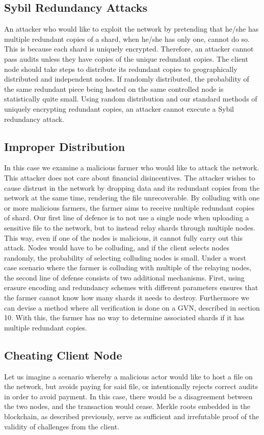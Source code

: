 \documentclass[a4paper,10pt]{article}
\begin{document}
\subsection{Sybil Redundancy Attacks}
An attacker who would like to exploit the network by pretending that he/she has multiple redundant copies of a shard, when he/she has only one, cannot do so. This is because each shard is uniquely encrypted. Therefore, an attacker cannot pass audits unless they have copies of the unique redundant copies. The client node should take steps to distribute its redundant copies to geographically distributed and independent nodes. If randomly distributed, the probability of the same redundant piece being hosted on the same controlled node is statistically quite small. Using random distribution and our standard methods of uniquely encrypting redundant copies, an attacker cannot execute a Sybil redundancy attack.  

\subsection{Improper Distribution}
In this case we examine a malicious farmer who would like to attack the network. This attacker does not care about financial disincentives. The attacker wishes to cause distrust in the network by dropping data and its redundant copies from the network at the same time, rendering the file unrecoverable. By colluding with one or more malicious farmers, the farmer aims to receive multiple redundant copies of shard. Our first line of defence is to not use a single node when uploading a sensitive file to the network, but to instead relay shards through multiple nodes. This way, even if one of the nodes is malicious, it cannot fully carry out this attack. Nodes would have to be colluding, and if the client selects nodes randomly, the probability of selecting colluding nodes is small. Under a worst case scenario where the farmer is colluding with multiple of the relaying nodes, the second line of defense consists of two additional mechanisms. First, using erasure encoding and redundancy schemes with different parameters ensures that the farmer cannot know how many shards it needs to destroy. Furthermore we can devise a method where all verification is done on a GVN, described in section 10. With this, the farmer has no way to determine associated shards if it has multiple redundant copies. 

\subsection{Cheating Client Node}
Let us imagine a scenario whereby a malicious actor would like to host a file on the network, but avoids paying for said file, or intentionally rejects correct audits in order to avoid payment. In this case, there would be a disagreement between the two nodes, and the transaction would cease. Merkle roots embedded in the blockchain, as described previously, serve as sufficient and irrefutable proof of the validity of challenges from the client.
\end{document}
